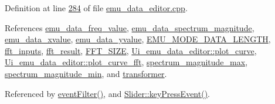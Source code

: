 Definition at line \hyperlink{a00035_source_l00284}{284} of file \hyperlink{a00035_source}{emu\+\_\+data\+\_\+editor.\+cpp}.



References \hyperlink{a00036_source_l00051}{emu\+\_\+data\+\_\+freq\+\_\+value}, \hyperlink{a00036_source_l00052}{emu\+\_\+data\+\_\+spectrum\+\_\+magnitude}, \hyperlink{a00036_source_l00046}{emu\+\_\+data\+\_\+xvalue}, \hyperlink{a00036_source_l00045}{emu\+\_\+data\+\_\+yvalue}, \hyperlink{a00003_source_l00031}{E\+M\+U\+\_\+\+M\+O\+D\+E\+\_\+\+D\+A\+T\+A\+\_\+\+L\+E\+N\+G\+T\+H}, \hyperlink{a00036_source_l00050}{fft\+\_\+inputs}, \hyperlink{a00036_source_l00049}{fft\+\_\+result}, \hyperlink{a00036_source_l00012}{F\+F\+T\+\_\+\+S\+I\+Z\+E}, \hyperlink{a00051_source_l00053}{Ui\+\_\+emu\+\_\+data\+\_\+editor\+::plot\+\_\+curve}, \hyperlink{a00051_source_l00071}{Ui\+\_\+emu\+\_\+data\+\_\+editor\+::plot\+\_\+curve\+\_\+fft}, \hyperlink{a00036_source_l00053}{spectrum\+\_\+magnitude\+\_\+max}, \hyperlink{a00036_source_l00054}{spectrum\+\_\+magnitude\+\_\+min}, and \hyperlink{a00036_source_l00044}{transformer}.



Referenced by \hyperlink{a00035_source_l00107}{event\+Filter()}, and \hyperlink{a00046_source_l00219}{Slider\+::key\+Press\+Event()}.


